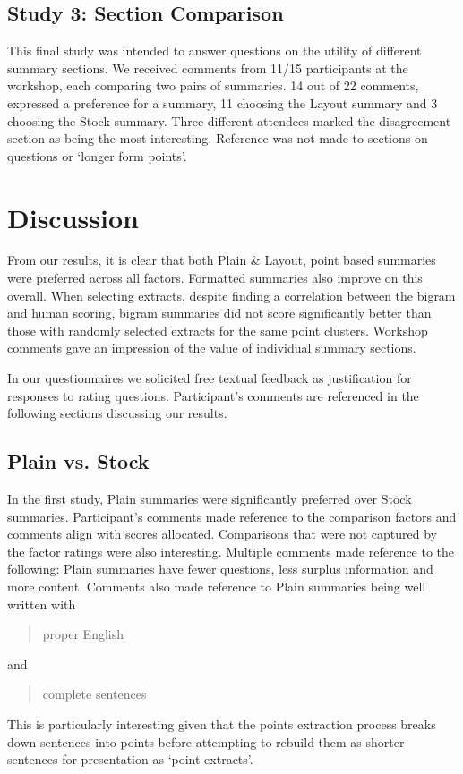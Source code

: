     \tocless\subsection{Study 3: Section Comparison}
      This final study was intended to answer questions on the utility of different summary sections. We received comments from 11/15 participants at the workshop, each comparing two pairs of summaries. 14 out of 22 comments, expressed a preference for a summary, 11 choosing the Layout summary and 3 choosing the Stock summary. Three different attendees marked the disagreement section as being the most interesting. Reference was not made to sections on questions or `longer form points'.

  \section{Discussion}
    From our results, it is clear that both Plain \& Layout, point based summaries were preferred across all factors. Formatted summaries also improve on this overall. When selecting extracts, despite finding a correlation between the bigram and human scoring, bigram summaries did not score significantly better than those with randomly selected extracts for the same point clusters. Workshop comments gave an impression of the value of individual summary sections.

    In our questionnaires we solicited free textual feedback as justification for responses to rating questions. Participant's comments are referenced in the following sections discussing our results.

    \tocless\subsection{Plain vs. Stock}
      In the first study, Plain summaries were significantly preferred over Stock summaries. Participant's comments made reference to the comparison factors and comments align with scores allocated. Comparisons that were not captured by the factor ratings were also interesting. Multiple comments made reference to the following: Plain summaries have fewer questions, less surplus information and more content. Comments also made reference to Plain summaries being well written with \blockquote{proper English} and \blockquote{complete sentences}. This is particularly interesting given that the points extraction process breaks down sentences into points before attempting to rebuild them as shorter sentences for presentation as `point extracts'.

